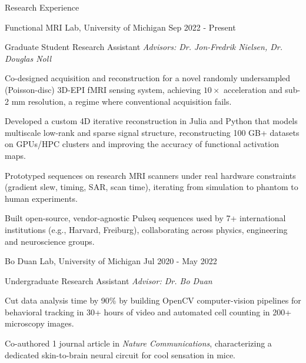 \documentclass{resume}
\begin{document}
\begin{rSection}{Research Experience}
    \begin{rSubsection}{Functional MRI Lab}{, University of Michigan \hfill {Sep 2022 - Present}}
    	\item {Graduate Student Research Assistant \hfill \textit{Advisors: Dr. Jon-Fredrik Nielsen, Dr. Douglas Noll}}
    	\begin{rSubsubsection}
            \item Co-designed acquisition and reconstruction for a novel randomly undersampled (Poisson-disc) 3D-EPI fMRI sensing system, achieving $10\times$ acceleration and sub-2 mm resolution, a regime where conventional acquisition fails.
            \item Developed a custom 4D iterative reconstruction in Julia and Python that models multiscale low-rank and sparse signal structure, reconstructing 100 GB+ datasets on GPUs/HPC clusters and improving the accuracy of functional activation maps.
            \item Prototyped sequences on research MRI scanners under real hardware constraints (gradient slew, timing, SAR, scan time), iterating from simulation to phantom to human experiments.
            \item Built open-source, vendor-agnostic Pulseq sequences used by 7+ international institutions (e.g., Harvard, Freiburg), collaborating across physics, engineering and neuroscience groups.
    	\end{rSubsubsection}
	\end{rSubsection}

    \begin{rSubsection}{Bo Duan Lab}{, University of Michigan \hfill {Jul 2020 - May 2022}}
	\item {Undergraduate Research Assistant \hfill \textit{Advisor: Dr. Bo Duan}}
	\begin{rSubsubsection}
        \item Cut data analysis time by 90\% by building OpenCV computer-vision pipelines for behavioral tracking in 30+ hours of video and automated cell counting in 200+ microscopy images.
        \item Co-authored 1 journal article in \textit{Nature Communications}, characterizing a dedicated skin-to-brain neural circuit for cool sensation in mice.
	\end{rSubsubsection}
    \end{rSubsection}
\end{rSection}
\end{document}
